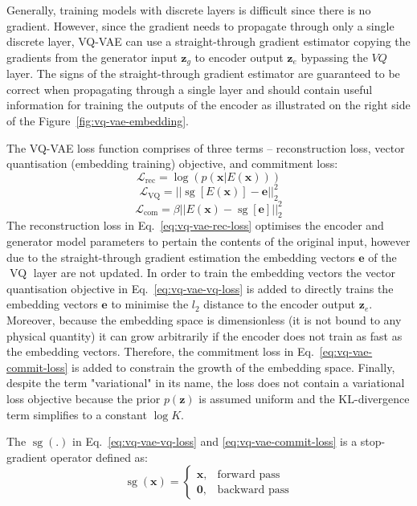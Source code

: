 \documentclass{article}
\DeclareMathOperator{\sg}{sg}
\DeclareMathOperator{\VQ}{VQ}
\begin{document}
Generally, training models with discrete layers is difficult since there is no gradient. However, since the gradient needs to propagate through only a single discrete layer, VQ-VAE can use a straight-through gradient estimator copying the gradients from the generator input $\mathbf{z}_g$ to encoder output $\mathbf{z}_e$ bypassing the $VQ$ layer. The signs of the straight-through gradient estimator are guaranteed to be correct when propagating through a single layer \citep{Bengio2013} and should contain useful information for training the outputs of the encoder as illustrated on the right side of the Figure~\ref{fig:vq-vae-embedding}.

The VQ-VAE loss function comprises of three terms -- reconstruction loss, vector quantisation (embedding training) objective, and commitment loss:
\begin{equation}
    \label{eq:vq-vae-rec-loss}
    \mathcal{L}_{\text{rec}} = \log(p(\mathbf{x}|E(\mathbf{x})))
\end{equation}
\begin{equation}
    \label{eq:vq-vae-vq-loss}
    \mathcal{L}_{\VQ} = ||\sg[E(\mathbf{x})] - \mathbf{e}||_2^2
\end{equation}
\begin{equation}
    \label{eq:vq-vae-commit-loss}
    \mathcal{L}_{\text{com}} = \beta||E(\mathbf{x}) - \sg[\mathbf{e}]||^2_2
\end{equation}
The reconstruction loss in Eq.~\ref{eq:vq-vae-rec-loss} optimises the encoder and generator model parameters to pertain the contents of the original input, however due to the straight-through gradient estimation the embedding vectors $\mathbf{e}$ of the $\VQ$ layer are not updated. 
In order to train the embedding vectors the vector quantisation objective in Eq.~\ref{eq:vq-vae-vq-loss} is added to directly trains the embedding vectors $\mathbf{e}$ to minimise the $l_2$ distance to the encoder output $\mathbf{z}_e$. 
Moreover, because the embedding space is dimensionless (it is not bound to any physical quantity) it can grow arbitrarily if the encoder does not train as fast as the embedding vectors. Therefore, the commitment loss in Eq.~\ref{eq:vq-vae-commit-loss} is added to constrain the growth of the embedding space. 
Finally, despite the term "variational" in its name, the loss does not contain a variational loss objective because the prior $p(\mathbf{z})$ is assumed uniform and the KL-divergence term simplifies to a constant $\log K$.

The $\sg(.)$ in Eq.~\ref{eq:vq-vae-vq-loss} and \ref{eq:vq-vae-commit-loss} is a stop-gradient operator defined as:
\begin{equation}
    \sg(\mathbf{x}) = 
    \begin{cases}
    \mathbf{x},  & \text{forward pass}\\
    \mathbf{0},  & \text{backward pass}
    \end{cases}
\end{equation}
\end{document}
